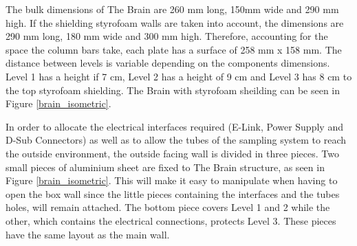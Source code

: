 
\smallskip
The bulk dimensions of The Brain are 260 mm long, 150mm wide and 290 mm high. If the shielding styrofoam walls are taken into account, the dimensions are 290 mm long, 180 mm wide and 300 mm high.
Therefore, accounting for the space the column bars take, each plate has a surface of 258 mm x 158 mm. The distance between levels is variable depending on the components dimensions. Level 1 has a height if 7 cm, Level 2 has a height of 9 cm and Level 3 has 8 cm to the top styrofoam shielding. The Brain with styrofoam sheilding can be seen in Figure \ref{brain_isometric}.


\smallskip
In order to allocate the electrical interfaces required (E-Link, Power Supply and D-Sub Connectors) as well as to allow the tubes of the sampling system to reach the outside environment, the outside facing wall is divided in three pieces. Two small pieces of aluminium sheet are fixed to The Brain structure, as seen in Figure \ref{brain_isometric}. This will make it easy to manipulate when having to open the box wall since the little pieces containing the interfaces and the tubes holes, will remain attached. The bottom piece covers Level 1 and 2 while the other, which contains the electrical connections, protects Level 3. These pieces have the same layout as the main wall. 










